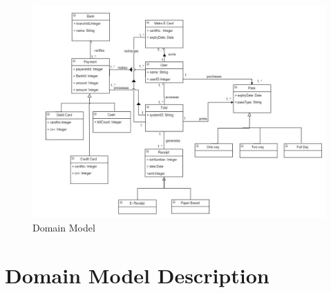 \documentclass[11pt,oneside]{book}
\begin{document}
\begin{figure}[htp]
\includegraphics[width = 14cm]{images/image3.jpg} 
    \centering
    \caption{Domain Model}
\end{figure}

\section{Domain Model Description }
\end{document}
